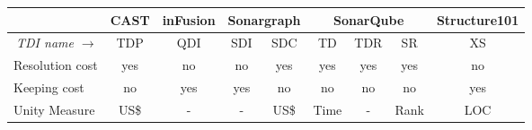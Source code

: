 \setlength{\tabcolsep}{0.2em}
\begin{tabularx}{\linewidth}{X|c|c|cc|ccc|c}
\toprule
\multicolumn{1}{c|}{}		
& \multicolumn{1}{c}{CAST}	
& \multicolumn{1}{c}{inFusion} 	
& \multicolumn{2}{c}{Sonargraph} 	 	
& \multicolumn{3}{c}{SonarQube}
& \multicolumn{1}{c}{Structure101}\\
\midrule
\multicolumn{1}{r|}{\em TDI name $\rightarrow$}	& TDP			& QDI	& SDI	& SDC	&
TD	& TDR	& SR	& XS	\\
\midrule
Resolution cost					& yes			& no	& no	& yes	& yes   & yes	& yes	& no	\\
Keeping cost					& no			& yes	& yes	& no	& no    & no	& no	& yes	\\
Unity Measure			& US\$ 		& -		& -		& US\$		& Time	& -		& Rank	& LOC	\\
\bottomrule 
\end{tabularx}%

